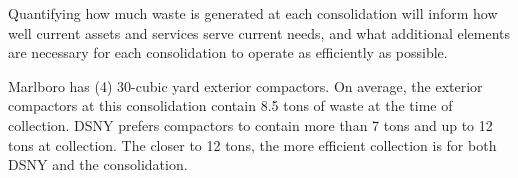 
    Quantifying how much waste is generated at each consolidation will inform how well current assets and services serve current needs, and what additional elements are necessary for each consolidation to operate as efficiently as possible.
    
    Marlboro has (4) 30-cubic yard exterior compactors. On average, the exterior compactors at this consolidation contain 8.5 tons of waste at the time of collection. DSNY prefers compactors to contain more than 7 tons and up to 12 tons at collection. The closer to 12 tons, the more efficient collection is for both DSNY and the consolidation.
